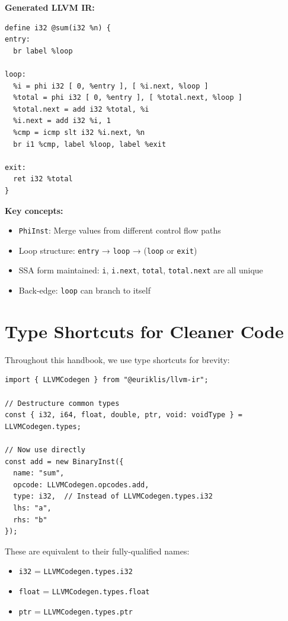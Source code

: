 \documentclass[11pt,oneside]{book}
\begin{document}
\textbf{Generated LLVM IR:}
\begin{lstlisting}[style=ir]
define i32 @sum(i32 %n) {
entry:
  br label %loop

loop:
  %i = phi i32 [ 0, %entry ], [ %i.next, %loop ]
  %total = phi i32 [ 0, %entry ], [ %total.next, %loop ]
  %total.next = add i32 %total, %i
  %i.next = add i32 %i, 1
  %cmp = icmp slt i32 %i.next, %n
  br i1 %cmp, label %loop, label %exit

exit:
  ret i32 %total
}
\end{lstlisting}

\textbf{Key concepts:}
\begin{itemize}[noitemsep]
  \item \texttt{PhiInst}: Merge values from different control flow paths
  \item Loop structure: \texttt{entry} → \texttt{loop} → (\texttt{loop} or \texttt{exit})
  \item SSA form maintained: \texttt{i}, \texttt{i.next}, \texttt{total}, \texttt{total.next} are all unique
  \item Back-edge: \texttt{loop} can branch to itself
\end{itemize}

\section{Type Shortcuts for Cleaner Code}

Throughout this handbook, we use type shortcuts for brevity:

\begin{lstlisting}[style=ts]
import { LLVMCodegen } from "@euriklis/llvm-ir";

// Destructure common types
const { i32, i64, float, double, ptr, void: voidType } = LLVMCodegen.types;

// Now use directly
const add = new BinaryInst({
  name: "sum",
  opcode: LLVMCodegen.opcodes.add,
  type: i32,  // Instead of LLVMCodegen.types.i32
  lhs: "a",
  rhs: "b"
});
\end{lstlisting}

These are equivalent to their fully-qualified names:
\begin{itemize}[noitemsep]
  \item \texttt{i32} = \texttt{LLVMCodegen.types.i32}
  \item \texttt{float} = \texttt{LLVMCodegen.types.float}
  \item \texttt{ptr} = \texttt{LLVMCodegen.types.ptr}
\end{itemize}
\end{document}
